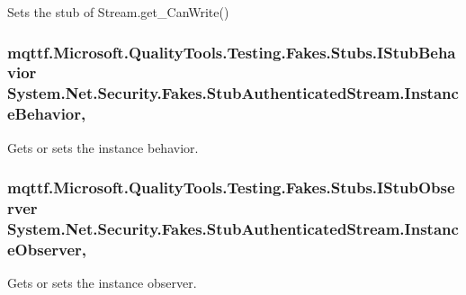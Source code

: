 Sets the stub of Stream.\-get\-\_\-\-Can\-Write()

\hypertarget{class_system_1_1_net_1_1_security_1_1_fakes_1_1_stub_authenticated_stream_ac71a3f8924e496d50ff2658c83dca6b4}{
\subsubsection[{Instance\-Behavior}]{\setlength{\rightskip}{0pt plus 5cm}mqttf.\-Microsoft.\-Quality\-Tools.\-Testing.\-Fakes.\-Stubs.\-I\-Stub\-Behavior System.\-Net.\-Security.\-Fakes.\-Stub\-Authenticated\-Stream.\-Instance\-Behavior\hspace{0.3cm}{\ttfamily [get]}, {\ttfamily [set]}}}\label{class_system_1_1_net_1_1_security_1_1_fakes_1_1_stub_authenticated_stream_ac71a3f8924e496d50ff2658c83dca6b4}


Gets or sets the instance behavior.

\hypertarget{class_system_1_1_net_1_1_security_1_1_fakes_1_1_stub_authenticated_stream_a2c664e639156987c171f5aafa33bc310}{
\subsubsection[{Instance\-Observer}]{\setlength{\rightskip}{0pt plus 5cm}mqttf.\-Microsoft.\-Quality\-Tools.\-Testing.\-Fakes.\-Stubs.\-I\-Stub\-Observer System.\-Net.\-Security.\-Fakes.\-Stub\-Authenticated\-Stream.\-Instance\-Observer\hspace{0.3cm}{\ttfamily [get]}, {\ttfamily [set]}}}\label{class_system_1_1_net_1_1_security_1_1_fakes_1_1_stub_authenticated_stream_a2c664e639156987c171f5aafa33bc310}


Gets or sets the instance observer.

